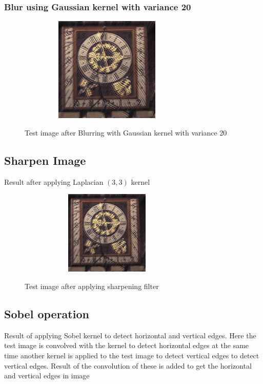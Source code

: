 \documentclass{article}
\begin{document}
\subsubsection[h]{Blur using Gaussian kernel with variance 20}
\begin{figure}[h]

\begin{minipage}[b]{1.0\linewidth}
  \centering
  \centerline{\includegraphics[width=8.5cm,height = 5cm ,keepaspectratio]{temp.jpg}}
  \centerline{Test image after Blurring with Gaussian kernel with variance 20}\medskip
\end{minipage}
%
\end{figure}


\subsection[h]{Sharpen Image}Result after applying Laplacian $(3,3)$ kernel
\begin{figure}[h]

\begin{minipage}[b]{1.0\linewidth}
  \centering
  \centerline{\includegraphics[width=8.5cm,height =4cm ,keepaspectratio]{temp.jpg}}
  \centerline{Test image after applying sharpening filter}\medskip
\end{minipage}
%
\end{figure}

 
\subsection[h]{Sobel operation}Result of applying Sobel kernel to detect horizontal and vertical edges. Here the test image is convolved with the kernel to detect horizontal edges at the same time another kernel is applied to the test image to detect vertical edges to detect vertical edges. Result of the convolution of these is added to get the horizontal and vertical edges in image
\end{document}

